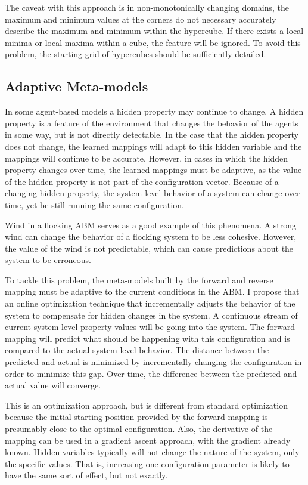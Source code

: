 The caveat with this approach is in non-monotonically changing domains, the maximum and minimum values at the corners do not necessary accurately describe the maximum and minimum within the hypercube.
If there exists a local minima or local maxima within a cube, the feature will be ignored.
To avoid this problem, the starting grid of hypercubes should be sufficiently detailed.



\subsection{Adaptive Meta-models}

In some agent-based models a hidden property may continue to change.
A hidden property is a feature of the environment that changes the behavior of the agents in some way, but is not directly detectable.
In the case that the hidden property does not change, the learned mappings will adapt to this hidden variable and the mappings will continue to be accurate.
However, in cases in which the hidden property changes over time, the learned mappings must be adaptive, as the value of the hidden property is not part of the configuration vector.
Because of a changing hidden property, the system-level behavior of a system can change over time, yet be still running the same configuration.

Wind in a flocking ABM serves as a good example of this phenomena.
A strong wind can change the behavior of a flocking system to be less cohesive.
However, the value of the wind is not predictable, which can cause predictions about the system to be erroneous.

To tackle this problem, the meta-models built by the forward and reverse mapping must be adaptive to the current conditions in the ABM.
I propose that an online optimization technique that incrementally adjusts the behavior of the system to compensate for hidden changes in the system.
A continuous stream of current system-level property values will be going into the system.
The forward mapping will predict what should be happening with this configuration and is compared to the actual system-level behavior.
The distance between the predicted and actual is minimized by incrementally changing the configuration in order to minimize this gap.
Over time, the difference between the predicted and actual value will converge.

This is an optimization approach, but is different from standard optimization because the initial starting position provided by the forward mapping is presumably close to the optimal configuration.
Also, the derivative of the mapping can be used in a gradient ascent approach, with the gradient already known.
Hidden variables typically will not change the nature of the system, only the specific values.
That is, increasing one configuration parameter is likely to have the same sort of effect, but not exactly.


